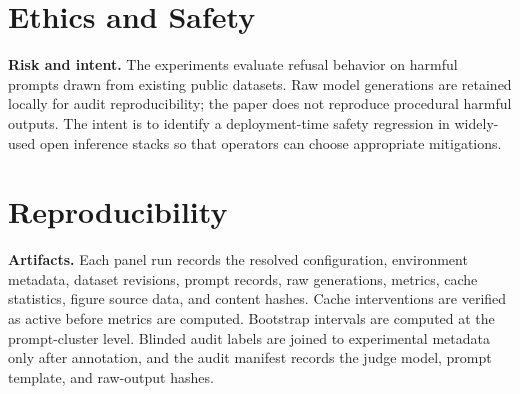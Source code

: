 \documentclass{article}
\begin{document}
\section{Ethics and Safety}

\textbf{Risk and intent.} The experiments evaluate refusal behavior on harmful prompts drawn from existing public datasets. Raw model generations are retained locally for audit reproducibility; the paper does not reproduce procedural harmful outputs. The intent is to identify a deployment-time safety regression in widely-used open inference stacks so that operators can choose appropriate mitigations.

\section{Reproducibility}

\textbf{Artifacts.} Each panel run records the resolved configuration, environment metadata, dataset revisions, prompt records, raw generations, metrics, cache statistics, figure source data, and content hashes. Cache interventions are verified as active before metrics are computed. Bootstrap intervals are computed at the prompt-cluster level. Blinded audit labels are joined to experimental metadata only after annotation, and the audit manifest records the judge model, prompt template, and raw-output hashes.



\end{document}
